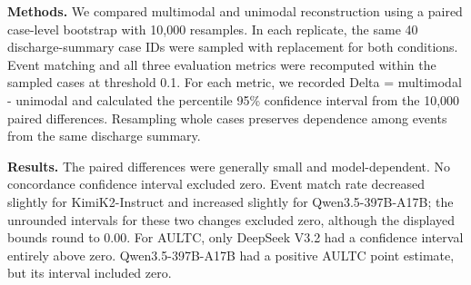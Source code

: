 \vspace{2mm}
\noindent\textbf{Methods.} We compared multimodal and unimodal reconstruction using a paired case-level bootstrap with 10,000 resamples. In each replicate, the same 40 discharge-summary case IDs were sampled with replacement for both conditions. Event matching and all three evaluation metrics were recomputed within the sampled cases at threshold 0.1. For each metric, we recorded Delta = multimodal - unimodal and calculated the percentile 95\% confidence interval from the 10,000 paired differences. Resampling whole cases preserves dependence among events from the same discharge summary.

\vspace{2mm}\noindent
\textbf{Results.} The paired differences were generally small and model-dependent. No concordance confidence interval excluded zero. Event match rate decreased slightly for KimiK2-Instruct and increased slightly for Qwen3.5-397B-A17B; the unrounded intervals for these two changes excluded zero, although the displayed bounds round to 0.00. For AULTC, only DeepSeek V3.2 had a confidence interval entirely above zero. Qwen3.5-397B-A17B had a positive AULTC point estimate, but its interval included zero.

